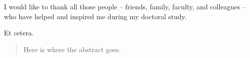   \approvalpage 
  \copyrightpage


  \begin{acknowledgements}

    I would like to thank all those people -- friends, family, faculty, and colleagues -- who have helped and inspired me during my doctoral study.

    Et cetera.
  \end{acknowledgements}
\ssp

\dsp


  \begin{abstract}
    Here is where the abstract goes.
  \end{abstract}





